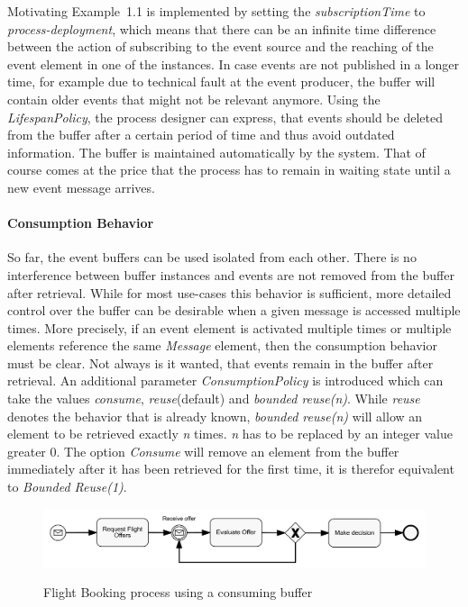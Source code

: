 Motivating Example~1.1 is implemented by setting the \textit{subscriptionTime} to \textit{process-deployment}, which means that there can be an infinite time difference between the action of subscribing to the event source and the reaching of the event element in one of the instances.
In case events are not published in a longer time, for example due to technical fault at the event producer, the buffer will contain older events that might not be relevant anymore.
Using the \textit{LifespanPolicy}, the process designer can express, that events should be deleted from the buffer after a certain period of time and thus avoid outdated information. The buffer is maintained automatically by the system.
That of course comes at the price that the process has to remain in waiting state until a new event message arrives.

\paragraph{Consumption Behavior\newline}

So far, the event buffers can be used isolated from each other. There is no interference between buffer instances and events are not removed from the buffer after retrieval.
While for most use-cases this behavior is sufficient, more detailed control over the buffer can be desirable when a given message is accessed multiple times. More precisely, if an event element is activated multiple times or multiple elements reference the same \textit{Message} element, then the consumption behavior must be clear.
Not always is it wanted, that events remain in the buffer after retrieval.
An additional parameter \textit{ConsumptionPolicy} is introduced which can take the values \textit{consume}, \textit{reuse}(default) and \textit{bounded reuse(n)}.
While \textit{reuse} denotes the behavior that is already known, \textit{bounded reuse(n)} will allow an element to be retrieved exactly \textit{n} times. \textit{n} has to be replaced by an integer value greater 0.
The option \textit{Consume} will remove an element from the buffer immediately after it has been retrieved for the first time, it is therefor equivalent to \textit{Bounded Reuse(1)}.




\begin{figure}[]
	\myfloatalign
	{\includegraphics[width=1\linewidth]{chapters/concept/bpmnx/FlightBooking.png}}
	\caption{Flight Booking process using a consuming buffer}\label{fig:example-flightbooking}
\end{figure}

